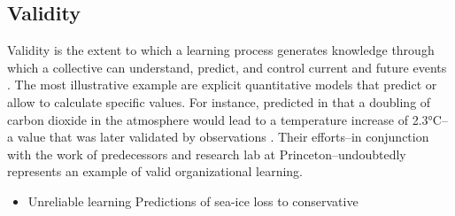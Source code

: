 
\subsection*{Validity}


Validity is the extent to which a learning process generates knowledge through which a collective can understand, predict, and control current and future events \citep{March1991a,Rerup2021}. The most illustrative example are explicit quantitative models that predict or allow to calculate specific values. 
For instance, \citeauthor{Manabe1967} predicted in \citeyear{Manabe1967} that a doubling of carbon dioxide in the atmosphere would lead to a temperature increase of 2.3°C--a value that was later validated by observations \citep{Forster2017}. Their efforts--in conjunction with the work of predecessors and research lab at Princeton--undoubtedly represents an example of valid organizational learning.

\begin{itemize}
	\item Unreliable learning
		\subitem \citet{Guarino2020}
		\subitem Predictions of sea-ice loss to conservative
\end{itemize}